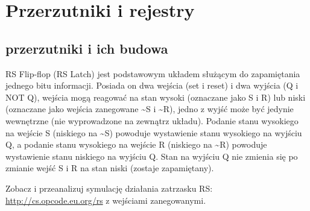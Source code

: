 % 
% 
% 
% 

\section{Przerzutniki i rejestry}

\subsection{przerzutniki i ich budowa}

RS Flip-flop (RS Latch) jest podstawowym układem służącym do zapamiętania jednego bitu informacji. Posiada on dwa wejścia (set i reset) i dwa wyjścia (Q i NOT Q), wejścia mogą reagować na stan wysoki (oznaczane jako S i R) lub niski (oznaczane jako wejścia zanegowane \~{}S i \~{}R), jedno z wyjść może być jedynie wewnętrzne (nie wyprowadzone na zewnątrz układu). Podanie stanu wysokiego na wejście S (niskiego na \~{}S) powoduje wystawienie stanu wysokiego na wyjściu Q, a podanie stanu wysokiego na wejście R (niskiego na \~{}R) powoduje wystawienie stanu niskiego na wyjściu Q. Stan na wyjściu Q nie zmienia się po zmianie wejść S i R na stan niski (zostaje zapamiętany).

Zobacz i przeanalizuj symulację działania zatrzasku RS: \url{http://cs.opcode.eu.org/rs} z wejściami zanegowanymi.

